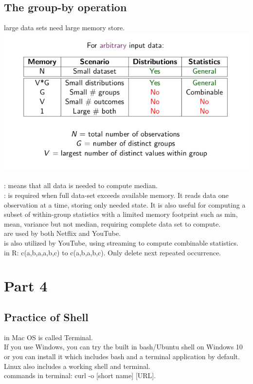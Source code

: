\documentclass{article}
\begin{document}
\subsection{The group-by operation}
 large data sets need large memory store. 
\begingroup\centering
\includegraphics{figures/dda}\\
\endgroup\\
\noindent
{}: means that all data is needed to compute median. \\
: is required when full data-set exceeds available memory. It reads data one observation at a time, storing only needed state. It is also useful for computing a subset of within-group statistics with a limited memory footprint such as min, mean, variance but not median, requiring complete data set to compute.\\
 are used by both Netflix and YouTube.\\
 is also utilized by YouTube, using streaming to compute combinable statistics. \\ 
 in R: c(a,b,a,a,b,c) to c(a,b,a,b,c). Only delete next repeated occurrence. \\
\section{Part 4}
\subsection{Practice of Shell}
 in Mac OS is called Terminal. \\
If you use Windows, you can try the built in bash/Ubuntu shell on Windows 10 or you can install it which includes bash and a terminal application by default. Linux also includes a working shell and terminal.\\
 commands in terminal: curl -o [short name] [URL].


\end{document}
